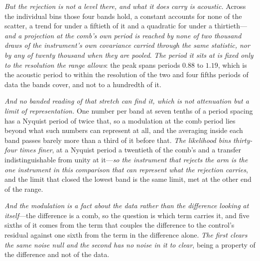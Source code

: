 \documentclass[11pt,a4paper]{article}
\theoremstyle{plain}
\theoremstyle{definition}
\theoremstyle{remark}
\begin{document}
\emph{But the rejection is not a level there, and what it does carry is acoustic.} Across the individual bins
those four bands hold, a constant accounts for none of the scatter, a trend for under a fiftieth of it and a
quadratic for under a thirtieth---\emph{and a projection at the comb's own period is reached by none of two
thousand draws of the instrument's own covariance carried through the same statistic, nor by any of twenty
thousand when they are pooled}. \emph{The period it sits at is fixed only to the resolution the range allows}: the peak
spans periods $0.88$ to $1.19$, which is the acoustic period to within the resolution of the two and four fifths
periods of data the bands cover, and not to a hundredth of it.

\emph{And no banded reading of that stretch can find it, which is not attenuation but a limit of
representation.} One number per band at seven tenths of a period spacing has a Nyquist period of twice that, so
a modulation at the comb period lies beyond what such numbers can represent at all, and the averaging inside
each band passes barely more than a third of it before that. \emph{The likelihood bins thirty-four times finer},
at a Nyquist period a twentieth of the comb's and a transfer indistinguishable from unity at it---\emph{so the
instrument that rejects the arm is the one instrument in this comparison that can represent what the rejection
carries}, and the limit that closed the lowest band is the same limit, met at the other end of the
range.

\emph{And the modulation is a fact about the data rather than the difference looking at itself}---the difference
is a comb, so the question is which term carries it, and five sixths of it comes from the term that couples the
difference to the control's residual against one sixth from the term in the difference alone. \emph{The first
clears the same noise null and the second has no noise in it to clear}, being a property of the difference and
not of the
data.
\end{document}
